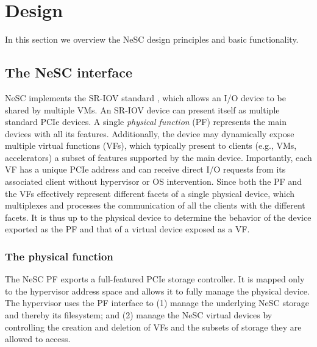 \section{Design}
\label{sec:design}

In this section we overview the NeSC design principles and basic functionality. 

\subsection{The NeSC interface}
NeSC implements the SR-IOV standard \cite{pcisigiov}, which allows an I/O device to be shared by multiple VMs.
An SR-IOV device can present itself as multiple standard PCIe devices. A single \emph{physical function} (PF) represents the main devices with all its features. Additionally, the device may dynamically expose multiple {virtual functions} (VFs), which typically present to clients (e.g., VMs, accelerators) a subset of features supported by the main device. Importantly, each VF has a unique PCIe address and can receive direct I/O requests from its associated client without hypervisor or OS intervention.
%
Since both the PF and the VFs effectively represent different facets of a single physical device, which multiplexes and processes the communication of all the clients with the different facets.
%
It is thus up to the physical device to determine the behavior of the device exported as the PF and that of a virtual device exposed as a VF.

\subsubsection*{The physical function}
The NeSC PF exports a full-featured PCIe storage controller. It is mapped only to the hypervisor address space and allows it to fully manage the physical  device.
The hypervisor uses the PF interface to
(1) manage the underlying NeSC storage and thereby its filesystem;
and (2) manage the NeSC virtual devices by controlling the creation and deletion of VFs and the subsets of storage they are allowed to access.

